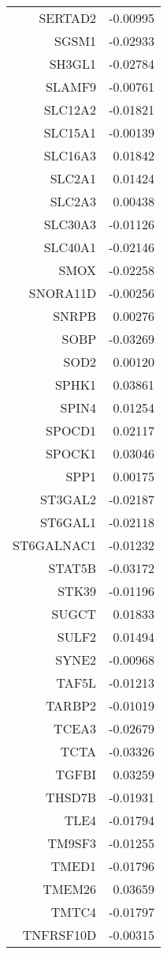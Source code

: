 \begin{longtable}{rr}
  SERTAD2 & -0.00995 \\ 
  SGSM1 & -0.02933 \\ 
  SH3GL1 & -0.02784 \\ 
  SLAMF9 & -0.00761 \\ 
  SLC12A2 & -0.01821 \\ 
  SLC15A1 & -0.00139 \\ 
  SLC16A3 & 0.01842 \\ 
  SLC2A1 & 0.01424 \\ 
  SLC2A3 & 0.00438 \\ 
  SLC30A3 & -0.01126 \\ 
  SLC40A1 & -0.02146 \\ 
  SMOX & -0.02258 \\ 
  SNORA11D & -0.00256 \\ 
  SNRPB & 0.00276 \\ 
  SOBP & -0.03269 \\ 
  SOD2 & 0.00120 \\ 
  SPHK1 & 0.03861 \\ 
  SPIN4 & 0.01254 \\ 
  SPOCD1 & 0.02117 \\ 
  SPOCK1 & 0.03046 \\ 
  SPP1 & 0.00175 \\ 
  ST3GAL2 & -0.02187 \\ 
  ST6GAL1 & -0.02118 \\ 
  ST6GALNAC1 & -0.01232 \\ 
  STAT5B & -0.03172 \\ 
  STK39 & -0.01196 \\ 
  SUGCT & 0.01833 \\ 
  SULF2 & 0.01494 \\ 
  SYNE2 & -0.00968 \\ 
  TAF5L & -0.01213 \\ 
  TARBP2 & -0.01019 \\ 
  TCEA3 & -0.02679 \\ 
  TCTA & -0.03326 \\ 
  TGFBI & 0.03259 \\ 
  THSD7B & -0.01931 \\ 
  TLE4 & -0.01794 \\ 
  TM9SF3 & -0.01255 \\ 
  TMED1 & -0.01796 \\ 
  TMEM26 & 0.03659 \\ 
  TMTC4 & -0.01797 \\ 
  TNFRSF10D & -0.00315 \\ 

\end{longtable}
